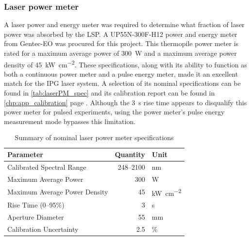             \subsubsection*{Laser power meter}
                A laser power and energy meter was required to determine what fraction of laser power was absorbed by the LSP. A UP55N-300F-H12 power and energy meter from Gentec-EO was procured for this project. This thermopile power meter is rated for a maximum average power of 300~W and a maximum average power density of \qty{45}{kW\per cm^2}. These specifications, along with its ability to function as both a continuous power meter and a pulse energy meter, made it an excellent match for the IPG laser system. A selection of its nominal specifications can be found in \autoref{tab:laserPM_spec} and its calibration report can be found in \autoref{chp:app_calibration} page \pageref*{ds:laserPM}. Although the \qty{3}{s} rise time appears to disqualify this power meter for pulsed experiments, using the power meter's pulse energy measurement mode bypasses this limitation. 

                \begin{table}[h]
                    \centering
                    \caption{Summary of nominal laser power meter specifications}
                    \label{tab:laserPM_spec}
                    \begin{tabular}{@{}lrl@{}}
                        \toprule
                        Parameter            & Quantity & Unit \\ \midrule
                        Calibrated Spectral Range     & 248--2100         & nm            \\
                        Maximum Average Power         & 300               & W             \\
                        Maximum Average Power Density & 45                & \unit{kW\per cm^2}             \\
                        Rise Time (0--95\%)          & 3                 & s            \\
                        Aperture Diameter             & 55                & mm           \\ 
                        Calibration Uncertainty       & 2.5               & \% \\
                        \bottomrule
                        \end{tabular}
                \end{table}

